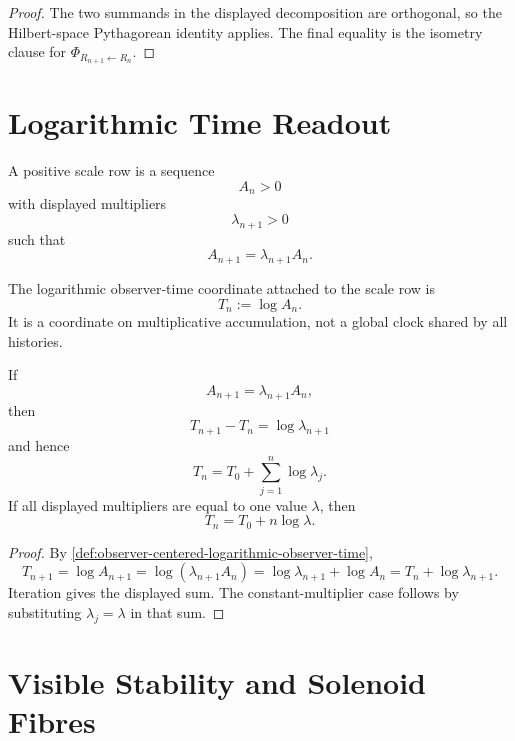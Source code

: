 \begin{proof}
The two summands in the displayed decomposition are orthogonal, so the
Hilbert-space Pythagorean identity applies. The final equality is the
isometry clause for $\Phi_{R_{n+1}\leftarrow R_n}$.
\end{proof}

\section{Logarithmic Time Readout}
\label{sec:observer-centered-logarithmic-time-readout}

\begin{definition}
\label{def:observer-centered-multiplicative-accumulation-scale}
A positive scale row is a sequence
$$
A_n>0
$$
with displayed multipliers
$$
\lambda_{n+1}>0
$$
such that
$$
A_{n+1}=\lambda_{n+1}A_n.
$$
\end{definition}

\begin{definition}
\label{def:observer-centered-logarithmic-observer-time}
The logarithmic observer-time coordinate attached to the scale row is
$$
T_n:=\log A_n.
$$
It is a coordinate on multiplicative accumulation, not a global clock
shared by all histories.
\end{definition}

\begin{theorem}
\label{thm:observer-centered-log-linearization}
If
$$
A_{n+1}=\lambda_{n+1}A_n,
$$
then
$$
T_{n+1}-T_n=\log\lambda_{n+1}
$$
and hence
$$
T_n=T_0+\sum_{j=1}^{n}\log\lambda_j.
$$
If all displayed multipliers are equal to one value $\lambda$, then
$$
T_n=T_0+n\log\lambda.
$$
\end{theorem}

\begin{proof}
By \autoref{def:observer-centered-logarithmic-observer-time},
$$
T_{n+1}
=
\log A_{n+1}
=
\log(\lambda_{n+1}A_n)
=
\log\lambda_{n+1}+\log A_n
=
T_n+\log\lambda_{n+1}.
$$
Iteration gives the displayed sum. The constant-multiplier case follows
by substituting $\lambda_j=\lambda$ in that sum.
\end{proof}

\section{Visible Stability and Solenoid Fibres}
\label{sec:observer-centered-visible-stability-solenoid-fibres}

